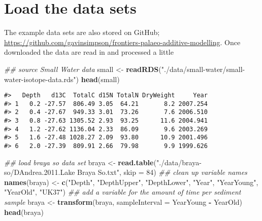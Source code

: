 \documentclass[12pt,]{article}
\newenvironment{Shaded}{\begin{snugshade}}{\end{snugshade}}
\newcommand{\CommentTok}[1]{\textcolor[rgb]{0.56,0.35,0.01}{\textit{#1}}}
\newcommand{\DataTypeTok}[1]{\textcolor[rgb]{0.13,0.29,0.53}{#1}}
\newcommand{\DecValTok}[1]{\textcolor[rgb]{0.00,0.00,0.81}{#1}}
\newcommand{\KeywordTok}[1]{\textcolor[rgb]{0.13,0.29,0.53}{\textbf{#1}}}
\newcommand{\NormalTok}[1]{#1}
\newcommand{\OperatorTok}[1]{\textcolor[rgb]{0.81,0.36,0.00}{\textbf{#1}}}
\newcommand{\StringTok}[1]{\textcolor[rgb]{0.31,0.60,0.02}{#1}}
\begin{document}
\hypertarget{load-the-data-sets}{%
\section{Load the data sets}\label{load-the-data-sets}}

The example data sets are also stored on GitHub;
\url{https://github.com/gavinsimpson/frontiers-palaeo-additive-modelling}.
Once downloaded the data are read in and processed a little

\begin{Shaded}
\begin{Highlighting}[]
\CommentTok{## source Small Water data}
\NormalTok{small <-}\StringTok{ }\KeywordTok{readRDS}\NormalTok{(}\StringTok{"./data/small-water/small-water-isotope-data.rds"}\NormalTok{)}
\KeywordTok{head}\NormalTok{(small)}
\end{Highlighting}
\end{Shaded}

\begin{verbatim}
#>   Depth   d13C  TotalC d15N TotalN DryWeight     Year
#> 1   0.2 -27.57  806.49 3.05  64.21       8.2 2007.254
#> 2   0.4 -27.67  949.33 3.01  73.26       7.6 2006.510
#> 3   0.8 -27.63 1305.52 2.93  93.25      11.6 2004.941
#> 4   1.2 -27.62 1136.04 2.33  86.09       9.6 2003.269
#> 5   1.6 -27.48 1028.27 2.09  93.80      10.9 2001.496
#> 6   2.0 -27.39  809.91 2.66  79.98       9.9 1999.626
\end{verbatim}

\begin{Shaded}
\begin{Highlighting}[]
\CommentTok{## load braya so data set}
\NormalTok{braya <-}\StringTok{ }\KeywordTok{read.table}\NormalTok{(}\StringTok{"./data/braya-so/DAndrea.2011.Lake Braya So.txt"}\NormalTok{,}
                    \DataTypeTok{skip =} \DecValTok{84}\NormalTok{)}
\CommentTok{## clean up variable names}
\KeywordTok{names}\NormalTok{(braya) <-}\StringTok{ }\KeywordTok{c}\NormalTok{(}\StringTok{"Depth"}\NormalTok{, }\StringTok{"DepthUpper"}\NormalTok{, }\StringTok{"DepthLower"}\NormalTok{, }\StringTok{"Year"}\NormalTok{, }\StringTok{"YearYoung"}\NormalTok{,}
                  \StringTok{"YearOld"}\NormalTok{, }\StringTok{"UK37"}\NormalTok{)}
\CommentTok{## add a variable for the amount of time per sediment sample}
\NormalTok{braya <-}\StringTok{ }\KeywordTok{transform}\NormalTok{(braya, }\DataTypeTok{sampleInterval =}\NormalTok{ YearYoung }\OperatorTok{-}\StringTok{ }\NormalTok{YearOld)}
\KeywordTok{head}\NormalTok{(braya)}
\end{Highlighting}
\end{Shaded}
\end{document}
